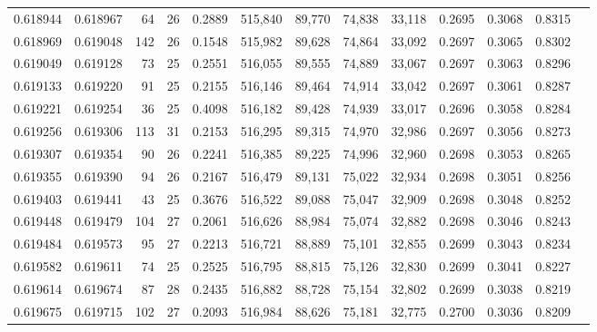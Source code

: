 \begin{tabular}{rrrrrrrrrrrrr}
0.618944 & 0.618967 &  64 &  26 &                                     0.2889 & 515,840 &  89,770 &  74,838 &  33,118 & 0.2695 & 0.3068 & 0.8315 \\
0.618969 & 0.619048 & 142 &  26 &                                     0.1548 & 515,982 &  89,628 &  74,864 &  33,092 & 0.2697 & 0.3065 & 0.8302 \\
0.619049 & 0.619128 &  73 &  25 &                                     0.2551 & 516,055 &  89,555 &  74,889 &  33,067 & 0.2697 & 0.3063 & 0.8296 \\
0.619133 & 0.619220 &  91 &  25 &                                     0.2155 & 516,146 &  89,464 &  74,914 &  33,042 & 0.2697 & 0.3061 & 0.8287 \\
0.619221 & 0.619254 &  36 &  25 &                                     0.4098 & 516,182 &  89,428 &  74,939 &  33,017 & 0.2696 & 0.3058 & 0.8284 \\
0.619256 & 0.619306 & 113 &  31 &                                     0.2153 & 516,295 &  89,315 &  74,970 &  32,986 & 0.2697 & 0.3056 & 0.8273 \\
0.619307 & 0.619354 &  90 &  26 &                                     0.2241 & 516,385 &  89,225 &  74,996 &  32,960 & 0.2698 & 0.3053 & 0.8265 \\
0.619355 & 0.619390 &  94 &  26 &                                     0.2167 & 516,479 &  89,131 &  75,022 &  32,934 & 0.2698 & 0.3051 & 0.8256 \\
0.619403 & 0.619441 &  43 &  25 &                                     0.3676 & 516,522 &  89,088 &  75,047 &  32,909 & 0.2698 & 0.3048 & 0.8252 \\
0.619448 & 0.619479 & 104 &  27 &                                     0.2061 & 516,626 &  88,984 &  75,074 &  32,882 & 0.2698 & 0.3046 & 0.8243 \\
0.619484 & 0.619573 &  95 &  27 &                                     0.2213 & 516,721 &  88,889 &  75,101 &  32,855 & 0.2699 & 0.3043 & 0.8234 \\
0.619582 & 0.619611 &  74 &  25 &                                     0.2525 & 516,795 &  88,815 &  75,126 &  32,830 & 0.2699 & 0.3041 & 0.8227 \\
0.619614 & 0.619674 &  87 &  28 &                                     0.2435 & 516,882 &  88,728 &  75,154 &  32,802 & 0.2699 & 0.3038 & 0.8219 \\
0.619675 & 0.619715 & 102 &  27 &                                     0.2093 & 516,984 &  88,626 &  75,181 &  32,775 & 0.2700 & 0.3036 & 0.8209 \\

\end{tabular}
